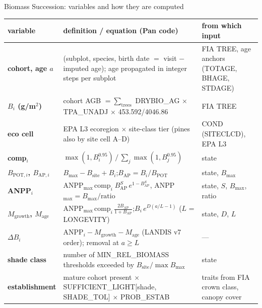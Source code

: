 \begin{frame}{Biomass Succession: variables and how they are computed}
\scriptsize
\renewcommand{\arraystretch}{1.07}
\begin{tabularx}{\textwidth}{@{}>{\bfseries}p{2.2cm}X>{\raggedright\arraybackslash}p{4.3cm}@{}}
\toprule
variable & definition / equation (Pan code) & from which input \\
\midrule
cohort, age $a$ & (subplot, species, birth date $=$ visit $-$ imputed age); age propagated in integer steps per subplot & FIA TREE, age anchors (TOTAGE, BHAGE, STDAGE) \\
$B_i$ (g/m$^2$) & cohort AGB $=\sum_{\text{trees}}$ DRYBIO\_AG $\times$ TPA\_UNADJ $\times$ 453.592/4046.86 & FIA TREE \\
eco cell & EPA L3 ecoregion $\times$ site-class tier (pines also by site cell A–D) & COND (SITECLCD), EPA L3 \\
comp$_i$ & $\max(1,B_i^{0.95})\,/\,\sum_j\max(1,B_j^{0.95})$ & state \\
$B_{\text{POT},i}$, $B_{\text{AP},i}$ & $B_{\max}-B_{\text{site}}+B_i$;\quad $B_{\text{AP}}=B_i/B_{\text{POT}}$ & state, $B_{\max}$ \\
ANPP$_i$ & ANPP$_{\max}\,\text{comp}_i\;B_{\text{AP}}^{S}\,e^{1-B_{\text{AP}}^{S}}$, ANPP$_{\max}=B_{\max}/\text{ratio}$ & state, $S$, $B_{\max}$, ratio \\
$M_{\text{growth}}$, $M_{\text{age}}$ & ANPP$_{\max}\,\text{comp}_i\,\frac{2B_{\text{AP}}}{1+B_{\text{AP}}}$;\quad $B_i\,e^{D(a/L-1)}$ ($L$ = LONGEVITY) & state, $D$, $L$ \\
$\Delta B_i$ & ANPP$_i - M_{\text{growth}} - M_{\text{age}}$ (LANDIS v7 order); removal at $a\ge L$ & — \\
shade class & number of MIN\_REL\_BIOMASS thresholds exceeded by $B_{\text{site}}/\max B_{\max}$ & state \\
establishment & mature cohort present $\times$ SUFFICIENT\_LIGHT[shade, SHADE\_TOL] $\times$ PROB\_ESTAB & traits from FIA crown class, canopy cover \\
\bottomrule
\end{tabularx}
\end{frame}
